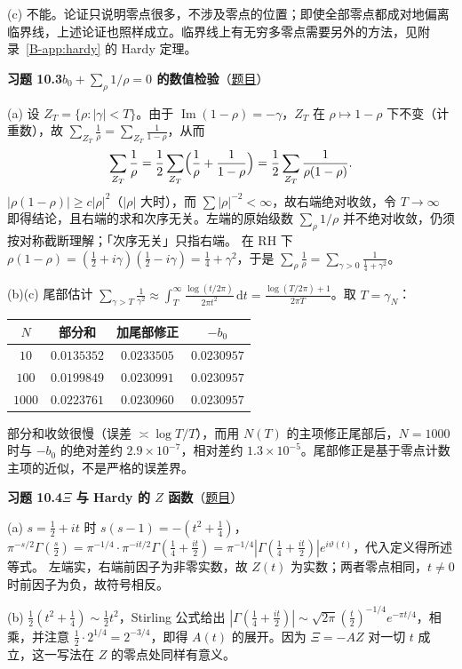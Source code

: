\documentclass[11pt,a4paper]{article}
\newcommand{\dd}{\,\mathrm{d}}
\renewcommand{\Im}{\operatorname{Im}}
\newcommand{\bref}[1]{\ref*{B-#1}}
\newcommand{\Sol}[2]{%
  \par\addvspace{1.2em}\noindent
  \hypertarget{s:#1}{}\textbf{习题 #1\quad #2}\hfill{\small（\hyperlink{q:#1}{题目}）}\par
  \nopagebreak\smallskip}
\begin{document}
(c) 不能。论证只说明零点很多，不涉及零点的位置；即使全部零点都成对地偏离临界线，上述论证也照样成立。临界线上有无穷多零点需要另外的方法，见附录~\bref{app:hardy} 的 Hardy 定理。

\Sol{10.3}{$b_0+\sum_\rho1/\rho=0$ 的数值检验}
(a) 设 $Z_T=\{\rho:|\gamma|<T\}$。由于 $\Im(1-\rho)=-\gamma$，$Z_T$ 在 $\rho\mapsto1-\rho$ 下不变（计重数），故 $\sum_{Z_T}\frac1\rho=\sum_{Z_T}\frac1{1-\rho}$，从而
\[
  \sum_{Z_T}\frac1\rho=\frac12\sum_{Z_T}\Bigl(\frac1\rho+\frac1{1-\rho}\Bigr)=\frac12\sum_{Z_T}\frac1{\rho(1-\rho)} .
\]
$|\rho(1-\rho)|\ge c|\rho|^2$（$|\rho|$ 大时），而 $\sum|\rho|^{-2}<\infty$，故右端绝对收敛，令 $T\to\infty$ 即得结论，且右端的求和次序无关。左端的原始级数 $\sum_\rho1/\rho$ 并不绝对收敛，仍须按对称截断理解；「次序无关」只指右端。
在 RH 下 $\rho(1-\rho)=(\frac12+i\gamma)(\frac12-i\gamma)=\frac14+\gamma^2$，于是 $\sum_\rho\frac1\rho=\sum_{\gamma>0}\frac1{\frac14+\gamma^2}$。

(b)(c) 尾部估计 $\sum_{\gamma>T}\frac1{\gamma^2}\approx\int_T^\infty\frac{\log(t/2\pi)}{2\pi t^2}\dd t=\frac{\log(T/2\pi)+1}{2\pi T}$。取 $T=\gamma_N$：
\begin{center}
\small
\begin{tabular}{@{}cccc@{}}
\toprule
$N$ & 部分和 & 加尾部修正 & $-b_0$ \\
\midrule
$10$ & $0.0135352$ & $0.0233505$ & $0.0230957$ \\
$100$ & $0.0199849$ & $0.0230991$ & $0.0230957$ \\
$1000$ & $0.0223761$ & $0.0230960$ & $0.0230957$ \\
\bottomrule
\end{tabular}
\end{center}
部分和收敛很慢（误差 $\asymp\log T/T$），而用 $N(T)$ 的主项修正尾部后，$N=1000$ 时与 $-b_0$ 的绝对差约 $2.9\times10^{-7}$，相对差约 $1.3\times10^{-5}$。尾部修正是基于零点计数主项的近似，不是严格的误差界。

\Sol{10.4}{$\Xi$ 与 Hardy 的 $Z$ 函数}
(a) $s=\frac12+it$ 时 $s(s-1)=-(t^2+\frac14)$，$\pi^{-s/2}\Gamma(\frac s2)=\pi^{-1/4}\cdot\pi^{-it/2}\Gamma(\frac14+\frac{it}2)=\pi^{-1/4}|\Gamma(\frac14+\frac{it}2)|e^{i\vartheta(t)}$，代入定义得所述等式。
左端实，右端前因子为非零实数，故 $Z(t)$ 为实数；两者零点相同，$t\neq0$ 时前因子为负，故符号相反。

(b) $\frac12(t^2+\frac14)\sim\frac12t^2$，Stirling 公式给出 $|\Gamma(\frac14+\frac{it}2)|\sim\sqrt{2\pi}(\frac t2)^{-1/4}e^{-\pi t/4}$，相乘，并注意 $\frac12\cdot2^{1/4}=2^{-3/4}$，即得 $A(t)$ 的展开。因为 $\Xi=-AZ$ 对一切 $t$ 成立，这一写法在 $Z$ 的零点处同样有意义。
\end{document}
